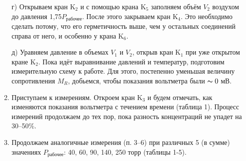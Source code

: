 \documentclass[a4paper,12pt]{article} %
\begin{document}
\begin{enumerate}
	
	г) Открываем кран K$_{2}$ и с помощью крана K$_{5}$ заполняем объём $V_{2}$ воздухом до давления 1,75$P_{\text{рабочее}}$. После этого закрываем кран K$_{4}$. Это необходимо сделать потому, что его герметичность выше, чем у остальных соединений справа от него, и особенно у крана K$_{6}$.
	
	
	д) Уравняем давление в объемах $V_{1}$ и $V_{2}$, открыв кран K$_{1}$ при уже открытом кране K$_{2}$. Пока идёт выравнивание давлений и температур, подготовим измерительную схему к работе. Для этого, постепенно уменьшая величину сопротивления $M_{R}$, добьемся, чтобы показания вольтметра были $\thicksim 0 $ мВ.
	
	
	\item Приступаем к измерениям. Откроем кран K$_{3}$ и будем отмечать, как изменяются показания вольтметра с течением времени (таблица 1). Процесс измерений продолжаем до тех пор, пока разность концентраций не упадет на 30–50\%.
	
	
	\item Продолжаем аналогичные измерения (п. 3–6) при различных 5 (в сумме) значениях $P_{\text{рабочее}}$: 40, 60, 90, 140, 250 торр (таблицы 1-5).

	
	

\end{enumerate}
\end{document}
